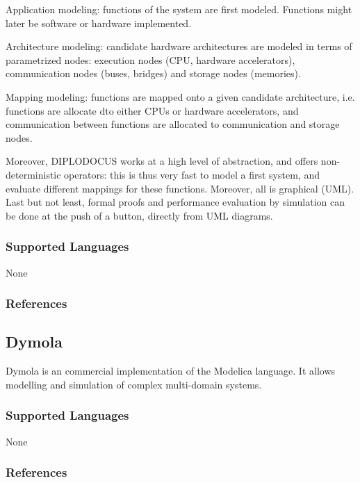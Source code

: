    Application modeling: functions of the system are first modeled. Functions might later be software or hardware implemented.

    Architecture modeling: candidate hardware architectures are modeled in terms of parametrized nodes: execution nodes (CPU, hardware accelerators), communication nodes (buses, bridges) and storage nodes (memories).

    Mapping modeling: functions are mapped onto a given candidate architecture, i.e. functions are allocate dto either CPUs or hardware accelerators, and communication between functions are allocated to communication and storage nodes.


Moreover, DIPLODOCUS works at a high level of abstraction, and offers non-deterministic operators: this is thus very fast to model a first system, and evaluate different mappings for these functions. Moreover, all is graphical (UML). Last but not least, formal proofs and performance evaluation by simulation can be done at the push of a button, directly from UML diagrams.

\subsubsection{Supported Languages}

None


\subsubsection{References}





\subsection{Dymola}
\label{subsecT:Dymola}


Dymola is an commercial implementation of the Modelica language. 
It allows modelling and simulation of complex multi-domain systems.

\subsubsection{Supported Languages}

None


\subsubsection{References}

